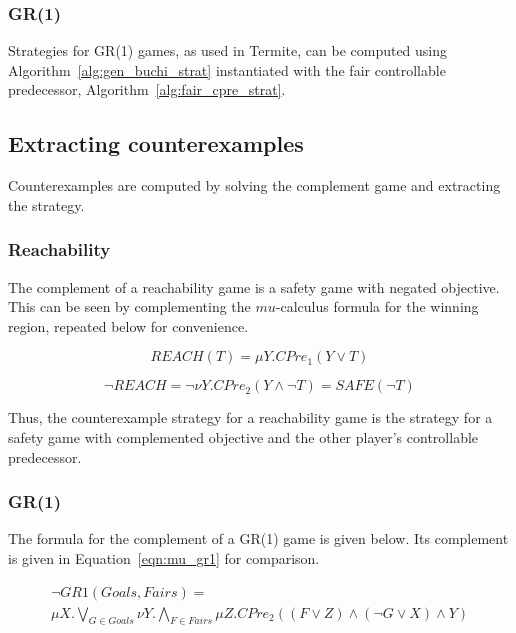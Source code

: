 \subsubsection{GR(1)}

Strategies for GR(1) games, as used in Termite, can be computed using Algorithm~\ref{alg:gen_buchi_strat} instantiated with the fair controllable predecessor, Algorithm~\ref{alg:fair_cpre_strat}.

\subsection{Extracting counterexamples}

Counterexamples are computed by solving the complement game and extracting the strategy.

\subsubsection{Reachability}

The complement of a reachability game is a safety game with negated objective. This can be seen by complementing the $mu$-calculus formula for the winning region, repeated below for convenience.

\begin{equation}
    \mathit{REACH}(T) = \mu Y. CPre_1(Y \vee T)
\end{equation}

\begin{equation}
    \neg\mathit{REACH} = \neg\nu Y. CPre_2(Y \wedge \neg T) = \mathit{SAFE}(\neg T) 
\end{equation}

Thus, the counterexample strategy for a reachability game is the strategy for a safety game with complemented objective and the other player's controllable predecessor. 

\subsubsection{GR(1)}

The formula for the complement of a GR(1) game is given below. Its complement is given in Equation~\ref{eqn:mu_gr1} for comparison.

\begin{multline}
    \neg GR1(Goals, Fairs) = \\ \mu X. \bigvee_{G \in Goals} \nu Y. \bigwedge_{F \in Fairs} \mu Z. CPre_2((F \vee Z) \wedge (\neg G \vee X) \wedge Y)
\end{multline}

